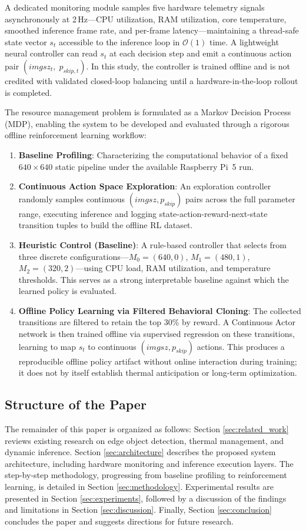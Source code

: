 \documentclass{ieeeaccess}
\begin{document}
A dedicated monitoring module samples five hardware telemetry signals asynchronously at 2\,Hz—CPU utilization, RAM utilization, core temperature, smoothed inference frame rate, and per-frame latency—maintaining a thread-safe state vector $s_t$ accessible to the inference loop in $\mathcal{O}(1)$ time. A lightweight neural controller can read $s_t$ at each decision step and emit a continuous action pair $(imgsz_t,\; p_{skip,t})$. In this study, the controller is trained offline and is not credited with validated closed-loop balancing until a hardware-in-the-loop rollout is completed.

The resource management problem is formulated as a Markov Decision Process (MDP), enabling the system to be developed and evaluated through a rigorous offline reinforcement learning workflow:
\begin{enumerate}
    \item \textbf{Baseline Profiling}: Characterizing the computational behavior of a fixed $640 \times 640$ static pipeline under the available Raspberry Pi~5 run.
    \item \textbf{Continuous Action Space Exploration}: An exploration controller randomly samples continuous $(imgsz, p_{skip})$ pairs across the full parameter range, executing inference and logging state-action-reward-next-state transition tuples to build the offline RL dataset.
    \item \textbf{Heuristic Control (Baseline)}: A rule-based controller that selects from three discrete configurations—$M_0\!=\!(640,0)$, $M_1\!=\!(480,1)$, $M_2\!=\!(320,2)$—using CPU load, RAM utilization, and temperature thresholds. This serves as a strong interpretable baseline against which the learned policy is evaluated.
    \item \textbf{Offline Policy Learning via Filtered Behavioral Cloning}: The collected transitions are filtered to retain the top 30\% by reward. A Continuous Actor network is then trained offline via supervised regression on these transitions, learning to map $s_t$ to continuous $(imgsz, p_{skip})$ actions. This produces a reproducible offline policy artifact without online interaction during training; it does not by itself establish thermal anticipation or long-term optimization.
\end{enumerate}

\subsection{Structure of the Paper}
The remainder of this paper is organized as follows: Section \ref{sec:related_work} reviews existing research on edge object detection, thermal management, and dynamic inference. Section \ref{sec:architecture} describes the proposed system architecture, including hardware monitoring and inference execution layers. The step-by-step methodology, progressing from baseline profiling to reinforcement learning, is detailed in Section \ref{sec:methodology}. Experimental results are presented in Section \ref{sec:experiments}, followed by a discussion of the findings and limitations in Section \ref{sec:discussion}. Finally, Section \ref{sec:conclusion} concludes the paper and suggests directions for future research.
\end{document}
